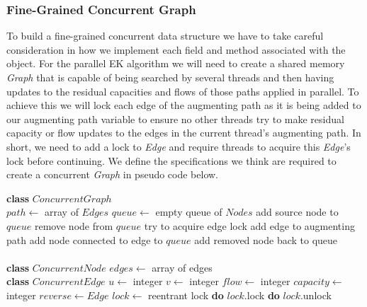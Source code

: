 \subsubsection{Fine-Grained Concurrent Graph}
 To build a fine-grained concurrent data structure we have to take careful consideration in how we implement each field and method associated with the object. For the parallel EK algorithm we will need to create a shared memory \textit{Graph} that is capable of being searched by several threads and then having updates to the residual capacities and flows of those paths applied in parallel. To achieve this we will lock each edge of the augmenting path as it is being added to our augmenting path variable to ensure no other threads try to make residual capacity or flow updates to the edges in the current thread's augmenting path. In short, we need to add a lock to \textit{Edge} and require threads to acquire this \textit{Edge}'s lock before continuing. We define the specifications we think are required to create a concurrent \textit{Graph} in pseudo code below. \\
 
\begin{algorithmic}

\State \textbf{class} $ConcurrentGraph$ \\
        \State $path \gets$ array of $Edges$
        \State $queue \gets$ empty queue of $Nodes$
        \State add source node to $queue$
            \State remove node from $queue$
                    \State try to acquire edge lock
                        \State add edge to augmenting path
                        \State add node connected to edge to $queue$
                    \Else
                        \State add removed node back to queue
                    \EndIf
                \EndIf
            \EndFor
        \EndWhile
    \EndFunction
\\ \\
\State \textbf{class} $ConcurrentNode$
    \State $edges\gets$ array of edges
\\
\State \textbf{class} $ConcurrentEdge$
    \State $u \gets$ integer
    \State $v \gets$ integer
    \State $flow \gets$ integer
    \State $capacity \gets$ integer
    \State $reverse \gets Edge$
    \State $lock \gets$ reentrant lock
        \State \textbf{do} $lock$.lock
    \EndFunction
        \State \textbf{do} $lock$.unlock
    \EndFunction
\end{algorithmic}

